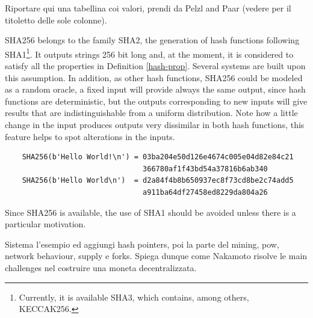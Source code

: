 \bigskip
\noindent
Riportare qui una tabellina coi valori, prendi da Pelzl and Paar (vedere per il titoletto delle sole colonne).

\bigskip
\noindent
\begin{myexample}
	SHA256 belongs to the family SHA2, the generation of hash functions following SHA1\footnote{Currently, it is available SHA3, which contains, among others, KECCAK256.}. It outputs  strings 256 bit long and, at the moment, it is considered to satisfy all the properties in Definition \ref{hash-prop}.
	Several systems are built upon this assumption. 
	In addition, as other hash functions, SHA256 could be modeled as a random oracle, a fixed input will provide always the same output, since hash functions are deterministic, but the outputs corresponding to new inputs will give results that are indistinguishable from a uniform distribution. 
	Note how a little change in the input produces outputs very dissimilar in both hash functions, this feature helps to spot alterations in the inputs.
	\begin{verbatim}
	SHA256(b'Hello World!\n') = 03ba204e50d126e4674c005e04d82e84c21
	                            366780af1f43bd54a37816b6ab340
	SHA256(b'Hello World\n')  = d2a84f4b8b650937ec8f73cd8be2c74add5
	                            a911ba64df27458ed8229da804a26
	\end{verbatim}
	Since SHA256 is available, the use of SHA1 should be avoided unless there is a particular motivation. 
\end{myexample}

\bigskip
\noindent

Sistema l'esempio ed aggiungi hash pointers, poi la parte del mining, pow, network behaviour, supply e forks. Spiega dunque come Nakamoto risolve le main challenges nel costruire una moneta decentralizzata.

